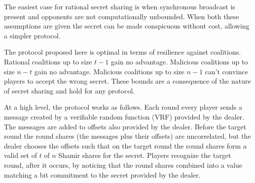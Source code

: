 \documentclass{dalcsthesis}
\begin{document}
The easiest case for rational secret sharing is when synchronous broadcast is present and opponents are not computationally unbounded. When both these assumptions are given the secret can be made conspicuous without cost, allowing a simpler protocol.

The protocol proposed here is optimal in terms of resilience against coalitions. Rational coalitions up to size $t-1$ gain no advantage. Malicious coalitions up to size $n-t$ gain no advantage. Malicious coalitions up to size $n-1$ can't convince players to accept the wrong secret. These bounds are a consequence of the nature of secret sharing and hold for any protocol.

At a high level, the protocol works as follows. Each round every player sends a message created by a verifiable random function (VRF) provided by the dealer. The messages are added to offsets also provided by the dealer. Before the target round the round shares (the messages plus their offsets) are uncorrelated, but the dealer chooses the offsets such that on the target round the round shares form a valid set of $t$ of $n$ Shamir shares for the secret. Players recognize the target round, after it occurs, by noticing that the round shares combined into a value matching a bit commitment to the secret provided by the dealer.
\end{document}
